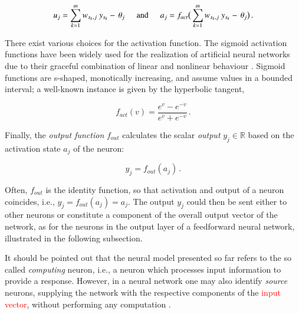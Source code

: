 \documentclass[longtitle]{elsarticle}
\numberwithin{equation}{section}
\theoremstyle{theorem}
\theoremstyle{definition}
\theoremstyle{remark}
\theoremstyle{proposition}
\numberwithin{figure}{section}
\begin{document}
		\begin{linenomath}\begin{equation*}
			u_j = \sum_{k = 1}^m w_{s_k,j} ~ y_{s_k} - \, \theta_j \hspace*{0.5cm} \text{and} \hspace*{0.5cm} a_j = f_{act} \big( \sum_{k = 1}^m w_{s_k,j} ~ y_{s_k} - \, \theta_j \big) \, .
		\end{equation*}\end{linenomath}		
		There exist various choices for the activation function. The sigmoid activation functions have been widely used for the realization of artificial neural networks due to their graceful combination of linear and nonlinear behaviour \cite{Hay05}. Sigmoid functions are s-shaped, monotically increasing, and assume values in a bounded interval; a well-known instance is given by the hyperbolic tangent,
		\begin{linenomath}\begin{equation*}
			f_{act}(v) = \dfrac{e^{v} - e^{-v}}{e^v + e^{-v}} \, .
		\end{equation*}\end{linenomath}
		Finally, the \emph{output function} $f_{out}$ calculates the scalar \emph{output} $y_j \in \mathbb{R}$ based on the activation state $a_j$ of the neuron:
		\begin{linenomath}\begin{equation*}
			y_j = f_{out}(a_j) \, .
		\end{equation*}\end{linenomath} 
		Often, $f_{out}$ is the identity function, so that activation and output of a neuron coincides, i.e., $y_j = f_{out}(a_j) = a_j$. The output $y_j$ could then be sent either to other neurons or constitute a component of the overall output vector of the network, as for the neurons in the output layer of a feedforward neural network, illustrated in the following subsection.
		
		It should be pointed out that the neural model presented so far refers to the so called \emph{computing} neuron, i.e., a neuron which processes input information to provide a response. However, in a neural network one may also identify \emph{source} neurons, supplying the network with the respective components of the \textcolor{red}{input vector}, without performing any computation \cite{Hay05}.
		
\end{document}
